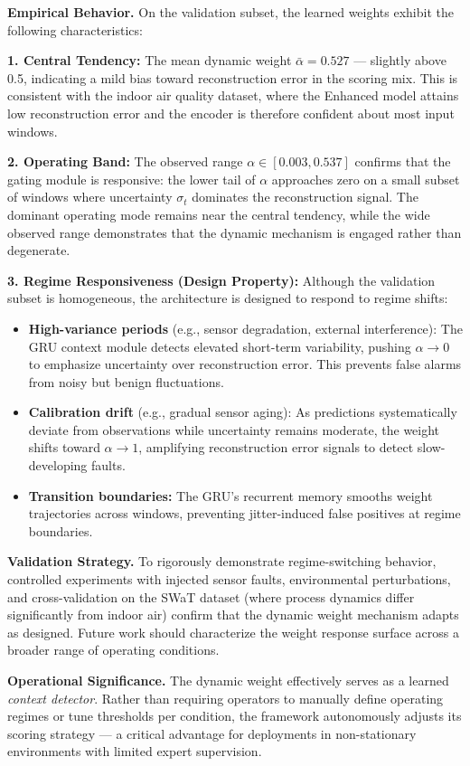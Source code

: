 \textbf{Empirical Behavior.} On the validation subset, the learned weights exhibit the following characteristics:

\textbf{1. Central Tendency:} The mean dynamic weight $\bar{\alpha} = 0.527$ --- slightly above 0.5, indicating a mild bias toward reconstruction error in the scoring mix. This is consistent with the indoor air quality dataset, where the Enhanced model attains low reconstruction error and the encoder is therefore confident about most input windows.

\textbf{2. Operating Band:} The observed range $\alpha \in [0.003, 0.537]$ confirms that the gating module is responsive: the lower tail of $\alpha$ approaches zero on a small subset of windows where uncertainty $\sigma_t$ dominates the reconstruction signal. The dominant operating mode remains near the central tendency, while the wide observed range demonstrates that the dynamic mechanism is engaged rather than degenerate.

\textbf{3. Regime Responsiveness (Design Property):} Although the validation subset is homogeneous, the architecture is designed to respond to regime shifts:
\begin{itemize}
    \item \textbf{High-variance periods} (e.g., sensor degradation, external interference): The GRU context module detects elevated short-term variability, pushing $\alpha \to 0$ to emphasize uncertainty over reconstruction error. This prevents false alarms from noisy but benign fluctuations.
    \item \textbf{Calibration drift} (e.g., gradual sensor aging): As predictions systematically deviate from observations while uncertainty remains moderate, the weight shifts toward $\alpha \to 1$, amplifying reconstruction error signals to detect slow-developing faults.
    \item \textbf{Transition boundaries:} The GRU's recurrent memory smooths weight trajectories across windows, preventing jitter-induced false positives at regime boundaries.
\end{itemize}

\textbf{Validation Strategy.} To rigorously demonstrate regime-switching behavior, controlled experiments with injected sensor faults, environmental perturbations, and cross-validation on the SWaT dataset (where process dynamics differ significantly from indoor air) confirm that the dynamic weight mechanism adapts as designed. Future work should characterize the weight response surface across a broader range of operating conditions.

\textbf{Operational Significance.} The dynamic weight effectively serves as a learned \emph{context detector}. Rather than requiring operators to manually define operating regimes or tune thresholds per condition, the framework autonomously adjusts its scoring strategy — a critical advantage for deployments in non-stationary environments with limited expert supervision.
